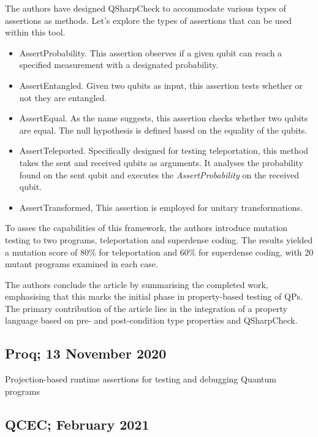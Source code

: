 \begin{itemize}
The authors have designed QSharpCheck to accommodate various types of assertions as methods. Let's explore the types of assertions that can be used within this tool.

\begin{itemize}
    \item AssertProbability. This assertion observes if a given qubit can reach a specified measurement with a designated probability.
    \item AssertEntangled. Given two qubits as input, this assertion tests whether or not they are entangled.
    \item AssertEqual. As the name suggests, this assertion checks whether two qubits are equal. The null hypothesis is defined based on the equality of the qubits.
    \item AssertTeleported. Specifically designed for testing teleportation, this method takes the sent and received qubits as arguments. It analyses the probability found on the sent qubit and executes the \textit{AssertProbability} on the received qubit.
    \item AssertTransformed, This assertion is employed for unitary transformations.
\end{itemize}

To asses the capabilities of this framework, the authors introduce mutation testing to two programs, teleportation and superdense coding. The results yielded a mutation score of $80\%$ for teleportation and $60\%$ for superdense coding, with 20 mutant programs examined in each case.\newline

The authors conclude the article by summarising the completed work, emphasising that this marks the initial phase in property-based testing of QPs. The primary contribution of the article lies in the integration of a property language based on pre- and post-condition type properties and QSharpCheck.

\vspace{15pt}
\subsection{Proq; 13 November 2020}

Projection-based runtime assertions for testing and debugging Quantum programs \cite{li2020projection}

\vspace{15pt}
\subsection{QCEC; February 2021}


\end{itemize}
